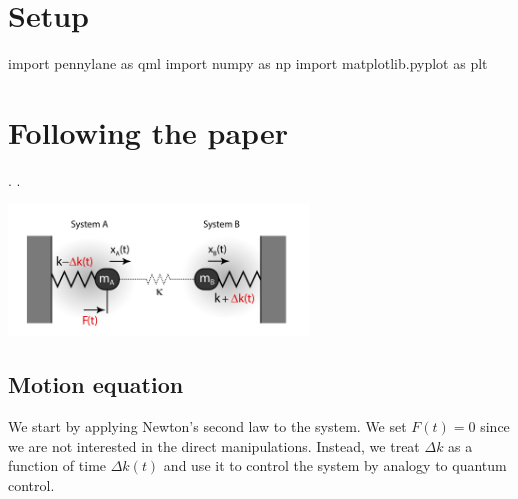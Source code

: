 \newcommand{\dk}[0]{\Delta k(t)}
\newcommand{\K}[0]{\kappa}
\newcommand{\Oc}[0]{\Omega_c}
\newcommand{\Oz}[0]{\Omega_0}
\newcommand{\Od}[0]{\Omega_d(t)}
\newcommand{\xp}[0]{x_+}
\newcommand{\xm}[0]{x_-}
\newcommand{\Op}[0]{\Omega_{+}}
\newcommand{\Om}[0]{\Omega_{-}}
\newcommand{\Opm}[0]{\Omega_{\pm}}
\newcommand{\Omp}[0]{\Omega_{\mp}}
\newcommand{\dO}[0]{\Delta\Omega}
\newcommand{\od}[0]{\omega_d(t)}
\renewcommand{\a}[0]{a(t)}
\renewcommand{\b}[0]{b(t)}
\newcommand{\odr}[0]{\omega_{drive}}
\newcommand{\ar}[0]{\overline{a}(t)}
\newcommand{\br}[0]{\overline{b}(t)}


\section{Setup}


\begin{python}
import pennylane as qml
import numpy as np
import matplotlib.pyplot as plt
\end{python}

\newpage

\section{Following the paper}

\ls {}.
\li {}.
\le

\begin{center}
  \includegraphics[width=0.6\textwidth]{img/osc.png}
\end{center}

\subsection{Motion equation}

We start by applying Newton's second law to the system. We set \(F(t) = 0\) since we are not
interested in the direct manipulations. Instead, we treat \(\Delta k\) as a function of time $\dk$
and use it to control the system by analogy to quantum control.

